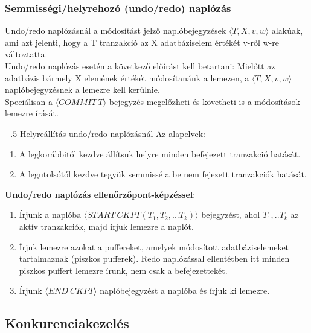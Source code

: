 \documentclass[margin=0px]{article}
\makeatletter
\renewcommand\paragraph{%
	\@startsection{paragraph}{4}{0mm}%
	{-\baselineskip}%
	{.5\baselineskip}%
	{\normalfont\normalsize\bfseries}}
\makeatother
\begin{document}
\subsubsection{Semmisségi/helyrehozó (undo/redo) naplózás}

Undo/redo naplózásnál a módosítást jelző naplóbejegyzések $\langle T,X,v,w \rangle$ alakúak, ami azt jelenti, hogy a T tranzakció
az X adatbáziselem értékét v-ről w-re változtatta.\\

Undo/redo naplózás esetén a következő előírást kell betartani: Mielőtt az adatbázis bármely X elemének értékét módosítanánk a lemezen,
a $\langle T,X,v,w \rangle$ naplóbejegyzésnek a lemezre kell kerülnie.\\

\noindent Speciálisan a $\langle COMMIT \ T\rangle$ bejegyzés megelőzheti és követheti is a módosítások lemezre írását.

\paragraph{Helyreállítás undo/redo naplózásnál}
\noindent Az alapelvek:
\begin{enumerate}
    \item	A legkorábbitól kezdve állítsuk helyre minden befejezett tranzakció hatását.
    \item	A legutolsótól kezdve tegyük semmissé a be nem fejezett tranzakciók hatását.
\end{enumerate}


\noindent \textbf{Undo/redo naplózás ellenőrzőpont-képzéssel}:
\begin{enumerate}
    \item	Írjunk a naplóba $\langle START \ CKPT(T_{1},T_{2},...T_{k}) \rangle$ bejegyzést, ahol $T_{1},..T_{k}$ az aktív
          tranzakciók, majd írjuk lemezre a naplót.

    \item	Írjuk lemezre azokat a puffereket, amelyek módosított adatbáziselemeket tartalmaznak (piszkos pufferek). Redo naplózással
          ellentétben itt minden piszkos puffert lemezre írunk, nem csak a befejezettekét.

    \item	Írjunk $\langle END \ CKPT \rangle$ naplóbejegyzést a naplóba és írjuk ki lemezre.
\end{enumerate}

\subsection{Konkurenciakezelés}
\end{document}
